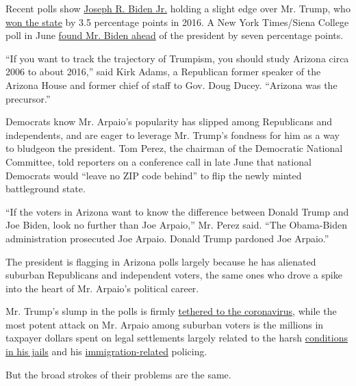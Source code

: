Recent polls show
\href{https://www.nytimes3xbfgragh.onion/interactive/2020/us/elections/joe-biden.html}{Joseph
R. Biden Jr.} holding a slight edge over Mr. Trump, who
\href{https://www.nytimes3xbfgragh.onion/elections/2016/results/arizona}{won
the state} by 3.5 percentage points in 2016. A New York Times/Siena
College poll in June
\href{https://www.nytimes3xbfgragh.onion/2020/06/25/upshot/poll-2020-biden-battlegrounds.html}{found
Mr. Biden ahead} of the president by seven percentage points.

``If you want to track the trajectory of Trumpism, you should study
Arizona circa 2006 to about 2016,'' said Kirk Adams, a Republican former
speaker of the Arizona House and former chief of staff to Gov. Doug
Ducey. ``Arizona was the precursor.''

Democrats know Mr. Arpaio's popularity has slipped among Republicans and
independents, and are eager to leverage Mr. Trump's fondness for him as
a way to bludgeon the president. Tom Perez, the chairman of the
Democratic National Committee, told reporters on a conference call in
late June that national Democrats would ``leave no ZIP code behind'' to
flip the newly minted battleground state.

``If the voters in Arizona want to know the difference between Donald
Trump and Joe Biden, look no further than Joe Arpaio,'' Mr. Perez said.
``The Obama-Biden administration prosecuted Joe Arpaio. Donald Trump
pardoned Joe Arpaio.''

The president is flagging in Arizona polls largely because he has
alienated suburban Republicans and independent voters, the same ones who
drove a spike into the heart of Mr. Arpaio's political career.

Mr. Trump's slump in the polls is firmly
\href{https://www.nytimes3xbfgragh.onion/2020/07/18/us/politics/trump-coronavirus-response-failure-leadership.html}{tethered
to the coronavirus}, while the most potent attack on Mr. Arpaio among
suburban voters is the millions in taxpayer dollars spent on legal
settlements largely related to the harsh
\href{https://www.azcentral.com/story/news/local/phoenix/2018/11/28/county-supervisors-approve-300-k-settlement-arpaio-era-jail-death/2138553002/}{conditions
in his jails} and his
\href{https://www.azcentral.com/story/news/local/phoenix/2018/02/01/county-paid-1-million-settle-arpaio-era-immigration-lawsuit/1086824001/}{immigration-related}
policing.

But the broad strokes of their problems are the same.

